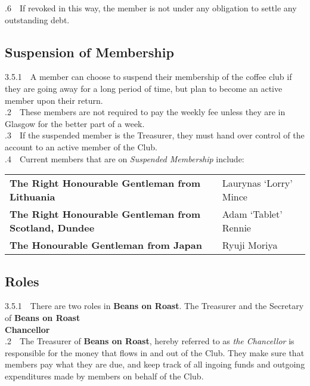 \documentclass[a4paper,11pt]{article}
\begin{document}
.6$\quad$If revoked in this way, the member is not under any obligation to settle any outstanding debt.\\

\subsection{Suspension of Membership}
\label{Suspension of Membership}
3.5.1$\quad$A member can choose to suspend their membership of the coffee club if they are going away for a long period of time, but plan to become an active member upon their return.\\ 

.2$\quad$These members are not required to pay the weekly fee unless they are in Glasgow for the better part of a week.\\ 

.3$\quad$If the suspended member is the Treasurer, they must hand over control of the account to an active member of the Club.\\  

.4$\quad$Current members that are on \textit{Suspended Membership} include:
\begin{table}[h!]
\begin{tabular}{ll}
\textbf{The Right Honourable Gentleman from Lithuania} & Laurynas `Lorry' Mince \\
\textbf{The Right Honourable Gentleman from Scotland, Dundee} & Adam `Tablet' Rennie \\
\textbf{The Honourable Gentleman from Japan} & Ryuji Moriya
\end{tabular}
\end{table}


\subsection{Roles}
\label{Roles}
3.5.1$\quad$There are two roles in \textbf{Beans on Roast}. The Treasurer and the Secretary of \textbf{Beans on Roast}\\
\textbf{Chancellor}\\

.2$\quad$The Treasurer of \textbf{Beans on Roast}, hereby referred to as \textit{the Chancellor} is responsible for the money that flows in and out of the Club. They make sure that members pay what they are due, and keep track of all ingoing funds and outgoing expenditures made by members on behalf of the Club.\\
\end{document}
